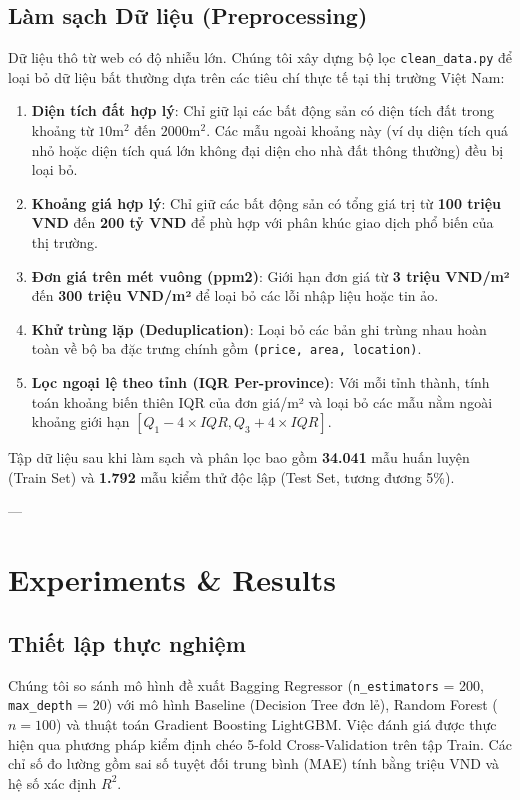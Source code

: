 \documentclass[sigconf]{acmart}
\begin{document}
\subsection{Làm sạch Dữ liệu (Preprocessing)}
Dữ liệu thô từ web có độ nhiễu lớn. Chúng tôi xây dựng bộ lọc \texttt{clean\_data.py} để loại bỏ dữ liệu bất thường dựa trên các tiêu chí thực tế tại thị trường Việt Nam:
\begin{enumerate}
    \item \textbf{Diện tích đất hợp lý}: Chỉ giữ lại các bất động sản có diện tích đất trong khoảng từ $10\text{m}^2$ đến $2000\text{m}^2$. Các mẫu ngoài khoảng này (ví dụ diện tích quá nhỏ hoặc diện tích quá lớn không đại diện cho nhà đất thông thường) đều bị loại bỏ.
    \item \textbf{Khoảng giá hợp lý}: Chỉ giữ các bất động sản có tổng giá trị từ \textbf{100 triệu VND} đến \textbf{200 tỷ VND} để phù hợp với phân khúc giao dịch phổ biến của thị trường.
    \item \textbf{Đơn giá trên mét vuông (ppm2)}: Giới hạn đơn giá từ \textbf{3 triệu VND/m²} đến \textbf{300 triệu VND/m²} để loại bỏ các lỗi nhập liệu hoặc tin ảo.
    \item \textbf{Khử trùng lặp (Deduplication)}: Loại bỏ các bản ghi trùng nhau hoàn toàn về bộ ba đặc trưng chính gồm \texttt{(price, area, location)}.
    \item \textbf{Lọc ngoại lệ theo tỉnh (IQR Per-province)}: Với mỗi tỉnh thành, tính toán khoảng biến thiên IQR của đơn giá/m² và loại bỏ các mẫu nằm ngoài khoảng giới hạn $[Q_1 - 4 \times IQR, Q_3 + 4 \times IQR]$.
\end{enumerate}

Tập dữ liệu sau khi làm sạch và phân lọc bao gồm \textbf{34.041} mẫu huấn luyện (Train Set) và \textbf{1.792} mẫu kiểm thử độc lập (Test Set, tương đương 5\%).

---

\section{Experiments \& Results}

\subsection{Thiết lập thực nghiệm}
Chúng tôi so sánh mô hình đề xuất Bagging Regressor (\texttt{n\_estimators} = 200, \texttt{max\_depth} = 20) với mô hình Baseline (Decision Tree đơn lẻ), Random Forest ($n=100$) và thuật toán Gradient Boosting LightGBM. Việc đánh giá được thực hiện qua phương pháp kiểm định chéo 5-fold Cross-Validation trên tập Train. Các chỉ số đo lường gồm sai số tuyệt đối trung bình (MAE) tính bằng triệu VND và hệ số xác định $R^2$.
\end{document}
